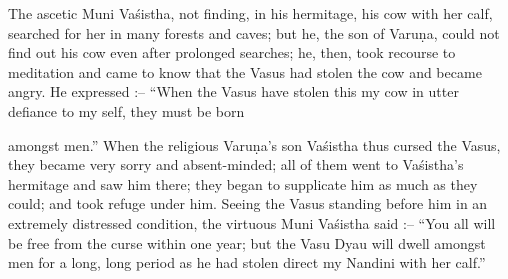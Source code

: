 The ascetic Muni Va\'sistha, not finding, in his hermitage, his cow with her calf, searched for her in many forests and caves; but he, the son of Varu\d{n}a, could not find out his cow even after prolonged searches; he, then, took recourse to meditation and came to know that the Vasus had stolen the cow and became angry. He expressed :-- ``When the Vasus have stolen this my cow in utter defiance to my self, they must be born

amongst men.'' When the religious Varu\d{n}a's son Va\'sistha thus cursed the Vasus, they became very sorry and absent-minded; all of them went to Va\'sistha's hermitage and saw him there; they began to supplicate him as much as they could; and took refuge under him. Seeing the Vasus standing before him in an extremely distressed condition, the virtuous Muni Va\'sistha said :-- ``You all will be free from the curse within one year; but the Vasu Dyau will dwell amongst men for a long, long period as he had stolen direct my Nandini with her calf.''

